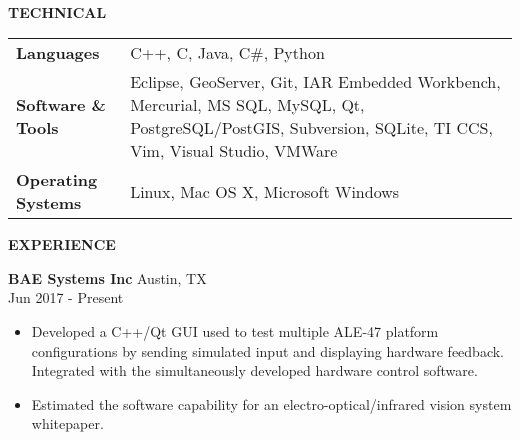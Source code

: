 \documentclass[10pt]{article}
\newcommand{\verticalspace}{\vspace{2.0mm}}
\newcommand{\horizontalrule}{\noindent\hrulefill}
\newcommand{\heading}{\noindent\Large\bf} %
\newcommand{\headingspace}{\vspace{3.5mm}}
\begin{document}
\renewcommand\familydefault{\sfdefault}





\noindent{\huge\bf \fullname}
\hfill

\vspace{-2mm}
\horizontalrule

\noindent 
\href{mailto:\email}{\email}
\hfill
\href{https://\website}{\website}
\hfill
\href{https://\linkedin}{\linkedin}
\\
\noindent \phonenumber
\hfill
\href{https://\github}{\github}

\headingspace
{\heading TECHNICAL}

\verticalspace

\begin{tabular}{@{} p{.2\linewidth} p{.75\linewidth}}

{\bf Languages} & C++, C, Java, C\#, Python \\

{\bf Software \& Tools} & Eclipse, GeoServer, Git, IAR Embedded Workbench, Mercurial, MS SQL, MySQL, Qt, PostgreSQL/PostGIS, Subversion, SQLite, TI CCS, Vim, Visual Studio, VMWare \\

{\bf Operating Systems} & Linux, Mac OS X, Microsoft Windows

\end{tabular}

{\heading EXPERIENCE}

\verticalspace

{\bf BAE Systems Inc} \hfill Austin, TX \\
 \hfill Jun 2017 - Present
\begin{itemize}
\item Developed a C++/Qt GUI used to test multiple ALE-47 platform configurations by sending simulated input and displaying hardware feedback.  Integrated with the simultaneously developed hardware control software.
\item Estimated the software capability for an electro-optical/infrared vision system whitepaper.
\end{itemize}
\end{document}
